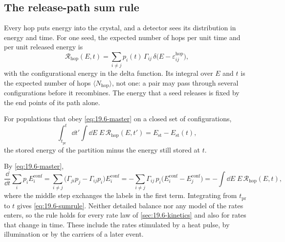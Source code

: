\subsection{The release-path sum rule}\label{sec:19.6-sumrule}

Every hop puts energy into the crystal, and a detector sees its distribution in energy and time. For one seed, the expected number of hops per unit time and per unit released energy is
\begin{equation}
  \mathcal{R}_{\mathrm{hop}}(E, t) = \sum_{i\ne j}p_i(t)\,\varGamma_{ij}\,\delta\bigl(E - \varepsilon^{\mathrm{hop}}_{ij}\bigr) ,
  \label{eq:19.6-Rhop}
\end{equation}
with the configurational energy in the delta function. Its integral over $E$ and $t$ is the expected number of hops $\langle N_{\mathrm{hop}}\rangle$, not one: a pair may pass through several configurations before it recombines. The energy that a seed releases is fixed by the end points of its path alone.
\begin{keyresult}
For populations that obey \cref{eq:19.6-master} on a closed set of configurations,
\begin{equation}
  \int_{t_{\mathrm{pr}}}^{t}\dd t'\int\dd E\;E\,\mathcal{R}_{\mathrm{hop}}(E, t') = E_{\mathrm{st}} - E_{\mathrm{st}}(t) ,
  \label{eq:19.6-sumrule}
\end{equation}
the stored energy of the partition minus the energy still stored at $t$.
\end{keyresult}
\noindent By \cref{eq:19.6-master},
\begin{equation*}
  \frac{\dd}{\dd t}\sum_ip_iE^{\mathrm{conf}}_i = \sum_{i\ne j}\bigl(\varGamma_{ji}p_j - \varGamma_{ij}p_i\bigr)E^{\mathrm{conf}}_i
  = -\sum_{i\ne j}\varGamma_{ij}\,p_i\bigl(E^{\mathrm{conf}}_i - E^{\mathrm{conf}}_j\bigr) = -\int\dd E\;E\,\mathcal{R}_{\mathrm{hop}}(E, t) ,
\end{equation*}
where the middle step exchanges the labels in the first term. Integrating from $t_{\mathrm{pr}}$ to $t$ gives \cref{eq:19.6-sumrule}. Neither detailed balance nor any model of the rates enters, so the rule holds for every rate law of \cref{sec:19.6-kinetics} and also for rates that change in time. These include the rates stimulated by a heat pulse, by illumination or by the carriers of a later event.

